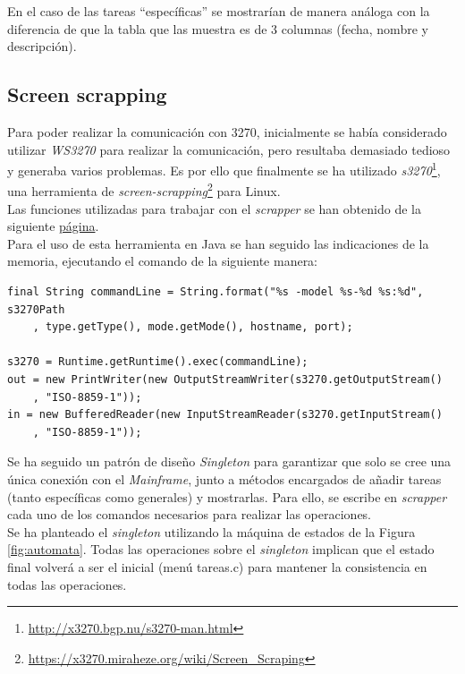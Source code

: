 \documentclass[10pt,a4paper]{article}
\begin{document}
En el caso de las tareas ``específicas'' se mostrarían de manera análoga con la diferencia de que la tabla que las muestra es de 3 columnas (fecha, nombre y descripción).


\subsection{Screen scrapping}

Para poder realizar la comunicación con 3270, inicialmente se había considerado utilizar \textit{WS3270} para realizar la comunicación, pero resultaba demasiado tedioso y generaba varios problemas. Es por ello que finalmente se ha utilizado \textit{s3270}\footnote{\url{http://x3270.bgp.nu/s3270-man.html}}, una herramienta de \textit{screen-scrapping}\footnote{\url{https://x3270.miraheze.org/wiki/Screen_Scraping}} para Linux. \\
Las funciones utilizadas para trabajar con el \textit{scrapper} se han obtenido de la siguiente \href{https://vebqa.github.io/f3270/release/doxygen/S3270_8java_source.html}{página}.\\
Para el uso de esta herramienta en Java se han seguido las indicaciones de la memoria, ejecutando el comando de la siguiente manera:

\begin{lstlisting}
final String commandLine = String.format("%s -model %s-%d %s:%d", s3270Path
	, type.getType(), mode.getMode(), hostname, port);

s3270 = Runtime.getRuntime().exec(commandLine);
out = new PrintWriter(new OutputStreamWriter(s3270.getOutputStream()
	, "ISO-8859-1"));
in = new BufferedReader(new InputStreamReader(s3270.getInputStream()
	, "ISO-8859-1"));
\end{lstlisting}

Se ha seguido un patrón de diseño \textit{Singleton} para garantizar que solo se cree una única conexión con el \textit{Mainframe}, junto a métodos encargados de añadir tareas (tanto específicas como generales) y mostrarlas. Para ello, se escribe en \textit{scrapper} cada uno de los comandos necesarios para realizar las operaciones.\\
Se ha planteado el \emph{singleton} utilizando la máquina de estados de la Figura \ref{fig:automata}. Todas las operaciones sobre el \emph{singleton} implican que el estado final volverá a ser el inicial (menú tareas.c) para mantener la consistencia en todas las operaciones.\\
\end{document}
